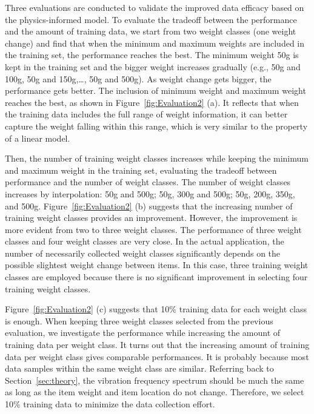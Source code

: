 Three evaluations are conducted to validate the improved data efficacy based on the physics-informed model. To evaluate the tradeoff between the performance and the amount of training data, we start from two weight classes (one weight change) and find that when the minimum and maximum weights are included in the training set, the performance reaches the best. The minimum weight 50g is kept in the training set and the bigger weight increases gradually (e.g., 50g and 100g, 50g and 150g,\ldots, 50g and 500g). As weight change gets bigger, the performance gets better. The inclusion of minimum weight and maximum weight reaches the best, as shown in Figure~\ref{fig:Evaluation2} (a). It reflects that when the training data includes the full range of weight information, it can better capture the weight falling within this range, which is very similar to the property of a linear model.

Then, the number of training weight classes increases while keeping the minimum and maximum weight in the training set, evaluating the tradeoff between performance and the number of weight classes. The number of weight classes increases by interpolation: 50g and 500g; 50g, 300g and 500g; 50g, 200g, 350g, and 500g. Figure~\ref{fig:Evaluation2} (b) suggests that the increasing number of training weight classes provides an improvement. However, the improvement is more evident from two to three weight classes. The performance of three weight classes and four weight classes are very close. In the actual application, the number of necessarily collected weight classes significantly depends on the possible slightest weight change between items. In this case, three training weight classes are employed because there is no significant improvement in selecting four training weight classes.

Figure~\ref{fig:Evaluation2} (c) suggests that 10\% training data for each weight class is enough. When keeping three weight classes selected from the previous evaluation, we investigate the performance while increasing the amount of training data per weight class. It turns out that the increasing amount of training data per weight class gives comparable performances. It is probably because most data samples within the same weight class are similar. Referring back to Section~\ref{sec:theory}, the vibration frequency spectrum should be much the same as long as the item weight and item location do not change. Therefore, we select 10\% training data to minimize the data collection effort.

